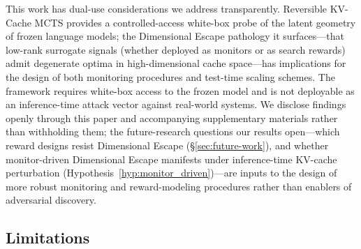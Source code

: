 \documentclass{article}
\begin{document}
This work has dual-use considerations we address transparently. Reversible KV-Cache MCTS provides a controlled-access white-box probe of the latent geometry of frozen language models; the Dimensional Escape pathology it surfaces---that low-rank surrogate signals (whether deployed as monitors or as search rewards) admit degenerate optima in high-dimensional cache space---has implications for the design of both monitoring procedures and test-time scaling schemes. The framework requires white-box access to the frozen model and is not deployable as an inference-time attack vector against real-world systems. We disclose findings openly through this paper and accompanying supplementary materials rather than withholding them; the future-research questions our results open---which reward designs resist Dimensional Escape (§\ref{sec:future-work}), and whether monitor-driven Dimensional Escape manifests under inference-time KV-cache perturbation (Hypothesis~\ref{hyp:monitor_driven})---are inputs to the design of more robust monitoring and reward-modeling procedures rather than enablers of adversarial discovery.

\subsection{Limitations}
\end{document}
